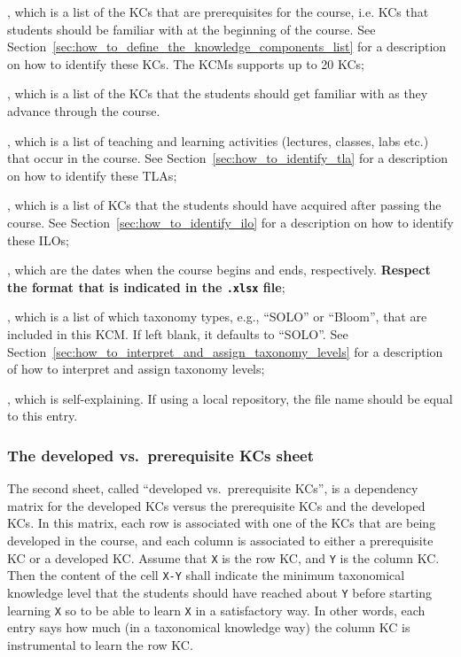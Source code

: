 \begin{itemize}

	, which is a list of the \acp{KC}
		that are prerequisites for the course, i.e. \acp{KC} that
		students should be familiar with at the beginning of the
		course. See
		Section~\ref{sec:how_to_define_the_knowledge_components_list}
		for a description on how to identify these \acp{KC}. The
		\acp{KCM} supports up to 20 \acp{KC};
	
	, which is a list of the \acp{KC}
		that the students should get familiar with as they advance
		through the course.
	
	, which is a list of teaching and learning
		activities (lectures, classes, labs etc.) that occur in the
		course. See Section~\ref{sec:how_to_identify_tla} for a
		description on how to identify these \acp{TLA};
	
	, which is a list of \acp{KC} that the
		students should have acquired after passing the course. See
		Section~\ref{sec:how_to_identify_ilo} for a description on
		how to identify these \acp{ILO};
	
	, which are the dates when the
		course begins and ends, respectively. \textbf{Respect the
		format that is indicated in the \texttt{.xlsx} file};
	
	, which is a list of which taxonomy
		types, e.g., ``SOLO'' or ``Bloom'', that are included in
		this \ac{KCM}. If left blank, it defaults to ``SOLO''. See
		Section~\ref{sec:how_to_interpret_and_assign_taxonomy_levels}
		for a description of how to interpret and assign taxonomy
		levels;
	
	, which is self-explaining. If using a local
		repository, the file name should be equal to this entry.

\end{itemize}


\subsubsection{The developed vs.\ prerequisite KCs sheet}

The second sheet, called ``developed vs.\ prerequisite KCs'', is a
dependency matrix for the developed \acp{KC} versus the prerequisite
\acp{KC} and the developed \acp{KC}. In this matrix, each row is associated
with one of the \acp{KC} that are being developed in the course, and each
column is associated to either a prerequisite \ac{KC} or a developed
\ac{KC}. Assume that \texttt{X} is the row \ac{KC}, and \texttt{Y} is the
column \ac{KC}. Then the content of the cell \texttt{X-Y} shall indicate the
minimum taxonomical knowledge level that the students should have reached
about \texttt{Y} before starting learning \texttt{X} so to be able to learn
\texttt{X} in a satisfactory way. In other words, each entry says how much
(in a taxonomical knowledge way) the column \ac{KC} is instrumental to learn
the row \ac{KC}.

